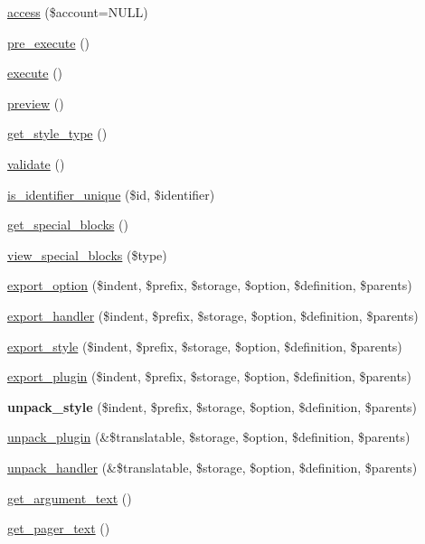 \begin{DoxyCompactItemize}
\item 
\hyperlink{classviews__plugin__display_a122d9a961584bfb6f0c4c78715c543e5}{access} (\$account=NULL)
\item 
\hyperlink{classviews__plugin__display_a04a01e109a38effdfbf77f78ecfd67ad}{pre\_\-execute} ()
\item 
\hyperlink{classviews__plugin__display_af99c4a303d3e409ab7b14c6cfcd3a1d8}{execute} ()
\item 
\hyperlink{classviews__plugin__display_a39a392ae163b9d5850559e3cf098e64f}{preview} ()
\item 
\hyperlink{classviews__plugin__display_a03f77cb37c3c3219d031c153aa59d20e}{get\_\-style\_\-type} ()
\item 
\hyperlink{classviews__plugin__display_a3282edb1b32b756937fe2d0c8757c80c}{validate} ()
\item 
\hyperlink{classviews__plugin__display_a089aaa0e268fbbc4aae2db742a7f036d}{is\_\-identifier\_\-unique} (\$id, \$identifier)
\item 
\hyperlink{classviews__plugin__display_a1bdcb99f6d9a78a4b035c254af48cb99}{get\_\-special\_\-blocks} ()
\item 
\hyperlink{classviews__plugin__display_a580af377b7d46013594e518c1d31534b}{view\_\-special\_\-blocks} (\$type)
\item 
\hyperlink{classviews__plugin__display_a69299ab50ce926752aa185d5120e35b0}{export\_\-option} (\$indent, \$prefix, \$storage, \$option, \$definition, \$parents)
\item 
\hyperlink{classviews__plugin__display_ae74383fcfdbc53ba6559e2d2f437bde1}{export\_\-handler} (\$indent, \$prefix, \$storage, \$option, \$definition, \$parents)
\item 
\hyperlink{classviews__plugin__display_ace03a36c988cd15555f87bedc13db304}{export\_\-style} (\$indent, \$prefix, \$storage, \$option, \$definition, \$parents)
\item 
\hyperlink{classviews__plugin__display_a1f54cc568f4f0968aea8ad74c5d6bc8d}{export\_\-plugin} (\$indent, \$prefix, \$storage, \$option, \$definition, \$parents)
\item 
\hypertarget{classviews__plugin__display_aa603795a470149bdce026746a10be077}{
{\bfseries unpack\_\-style} (\$indent, \$prefix, \$storage, \$option, \$definition, \$parents)}
\label{classviews__plugin__display_aa603795a470149bdce026746a10be077}

\item 
\hyperlink{classviews__plugin__display_abffcd71a6d0d188e6d42f790ce7f369d}{unpack\_\-plugin} (\&\$translatable, \$storage, \$option, \$definition, \$parents)
\item 
\hyperlink{classviews__plugin__display_a382cd5755818e3f652caa5d3fe1f967d}{unpack\_\-handler} (\&\$translatable, \$storage, \$option, \$definition, \$parents)
\item 
\hyperlink{classviews__plugin__display_a3afbeac02cf2d083014cf64c3e66c290}{get\_\-argument\_\-text} ()
\item 
\hyperlink{classviews__plugin__display_add6b60160cfdbc8b0ea29a380854057e}{get\_\-pager\_\-text} ()
\end{DoxyCompactItemize}
